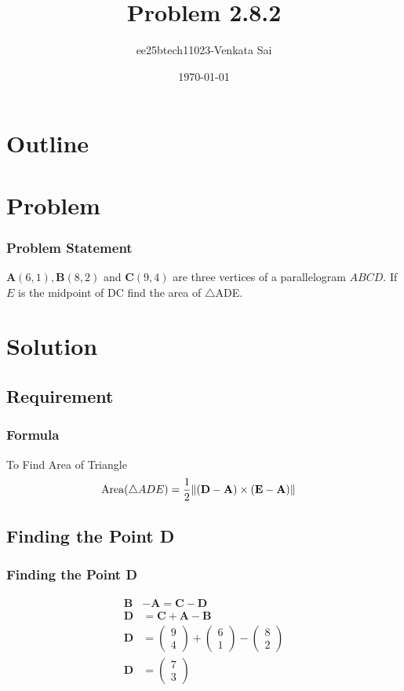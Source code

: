 \documentclass{beamer}
\title{Problem 2.8.2}
\author{ee25btech11023-Venkata Sai}
\date{\today}
\providecommand{\brak}[1]{\ensuremath{\left(#1\right)}}
\theoremstyle{remark}
\providecommand{\norm}[1]{\lVert#1\rVert}
\newcommand{\myvec}[1]{\ensuremath{\begin{pmatrix}#1\end{pmatrix}}}
\let\vec\mathbf
\numberwithin{equation}{section}
\begin{document}
\begin{frame}
\titlepage
\end{frame}

\section*{Outline}
\begin{frame}
\tableofcontents
\end{frame}
\section{Problem}
\begin{frame}
\frametitle{Problem Statement}
%
$\vec{A}\brak{6,1},\vec{B}\brak{8, 2}$ and $\vec{C}\brak{9, 4}$ are three vertices of a parallelogram $ABCD$. If $E$ is the
midpoint of DC find the area of $\triangle$ADE. 
\end{frame}
\section{Solution}
\subsection{Requirement}
\begin{frame}
\frametitle{Formula}
\setcounter{section}{1}
To Find Area of Triangle
\begin{align}
\text{Area\brak{\triangle ADE}}&=\frac12\norm{\brak{\vec{D}-\vec{A}}\times\brak{\vec{E}-\vec{A}}}
\end{align}

\end{frame}
\subsection{Finding the Point D}
\begin{frame}
\frametitle{Finding the Point D}

\begin{align}
\vec{B}&-\vec{A}=\vec{C}-\vec{D} \\
    \vec{D}&=\vec{C}+\vec{A}-\vec{B} \\
    \vec{D}&=\myvec{9\\4}+\myvec{6\\1}-\myvec{8\\2} \\
    \vec{D}&=\myvec{7\\3}
\end{align}
\end{frame}
\end{document}
